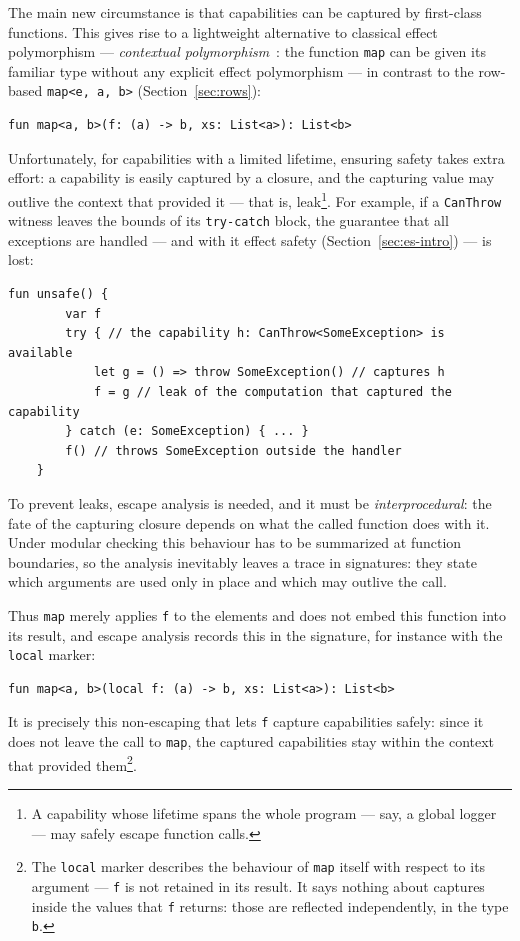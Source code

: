 \documentclass[11pt]{article}
\begin{document}
The main new circumstance is that capabilities can be captured by first-class functions.
This gives rise to a lightweight alternative to classical effect polymorphism ---
\emph{contextual polymorphism}~\cite{brachthauser2020effects, brachthauser2022effects}:
the function \texttt{map} can be given its familiar type without any explicit effect
polymorphism --- in contrast to the row-based \texttt{map<e, a, b>}
(Section~\ref{sec:rows}):
\begin{lstlisting}[language=colang]
    fun map<a, b>(f: (a) -> b, xs: List<a>): List<b>
\end{lstlisting}

Unfortunately, for capabilities with a limited lifetime, ensuring safety takes extra
effort: a capability is easily captured by a closure, and the capturing value may
outlive the context that provided it --- that is, leak\footnote{A capability whose
lifetime spans the whole program --- say, a global logger --- may safely escape function calls.}.
For example, if a \lstinline|CanThrow| witness leaves the bounds of its
\lstinline|try-catch| block, the guarantee that all exceptions are handled --- and with
it effect safety (Section~\ref{sec:es-intro}) --- is lost:
\begin{lstlisting}[language=colang]
    fun unsafe() {
        var f
        try { // the capability h: CanThrow<SomeException> is available
            let g = () => throw SomeException() // captures h
            f = g // leak of the computation that captured the capability
        } catch (e: SomeException) { ... }
        f() // throws SomeException outside the handler
    }
\end{lstlisting}
To prevent leaks, escape analysis is needed, and it must be \emph{interprocedural}: the
fate of the capturing closure depends on what the called function does with it. Under
modular checking this behaviour has to be summarized at function boundaries, so the
analysis inevitably leaves a trace in signatures: they state which arguments are used
only in place and which may outlive the call.

Thus \texttt{map} merely applies \lstinline|f| to the elements and does not embed this
function into its result, and escape analysis records this in the signature, for
instance with the \lstinline|local| marker:
\begin{lstlisting}[language=colang]
    fun map<a, b>(local f: (a) -> b, xs: List<a>): List<b>
\end{lstlisting}
It is precisely this non-escaping that lets \lstinline|f| capture capabilities safely:
since it does not leave the call to \texttt{map}, the captured capabilities stay within
the context that provided them\footnote{The \lstinline|local| marker describes the
behaviour of \texttt{map} itself with respect to its argument --- \lstinline|f| is not
retained in its result. It says nothing about captures inside the values that
\lstinline|f| returns: those are reflected independently, in the type \lstinline|b|.}.
\end{document}
